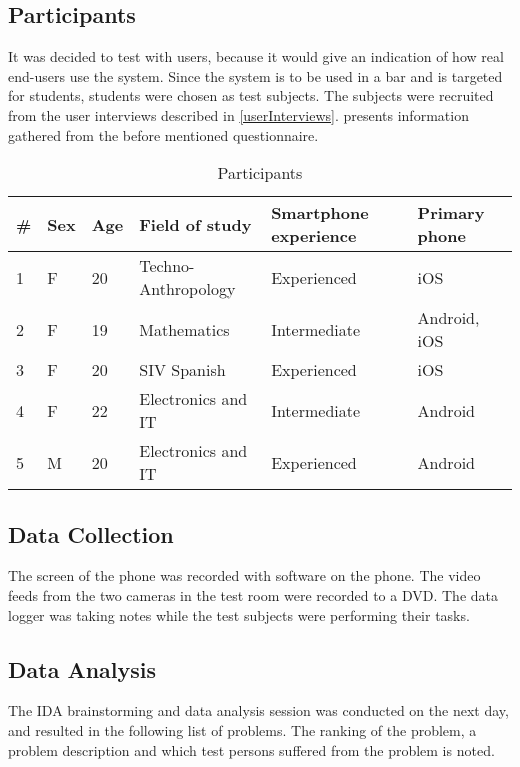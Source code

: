 \subsection{Participants}
It was decided to test with users, because it would give an indication
of how real end-users use the system. Since the system is to be used
in a bar and is targeted for students, students were chosen as test
subjects. The subjects were recruited from the user interviews
described in \cref{userInterviews}.  presents
information gathered from the before mentioned questionnaire.

\begin{table}[h]
\begin{tabular}{|l|l|l|l|l|l|}
\hline
\textbf{\#} & \textbf{Sex} & \textbf{Age} & \textbf{Field of study} & \textbf{Smartphone experience} & \textbf{Primary phone} \\ \hline
1                   & F               & 20           & Techno-Anthropology       & Experienced                    & iOS                    \\ \hline
2                   & F               & 19           & Mathematics             & Intermediate                   & Android, iOS           \\ \hline
3                   & F               & 20           & SIV Spanish             & Experienced                    & iOS                    \\ \hline
4                   & F               & 22           & Electronics and IT      & Intermediate                   & Android                \\ \hline
5                   & M               & 20           & Electronics and IT      & Experienced                    & Android                \\ \hline
\end{tabular}
\caption{Participants}\label{tab:participants}
\end{table}

\subsection{Data Collection}
The screen of the phone was recorded with software on the phone. The
video feeds from the two cameras in the test room were recorded to a
DVD. The data logger was taking notes while the test subjects were
performing their tasks.

\subsection{Data Analysis}
The IDA brainstorming and data analysis session was conducted on the next
day, and resulted in the following list of problems. The ranking of
the problem, a problem description and which test persons suffered
from the problem is noted.

